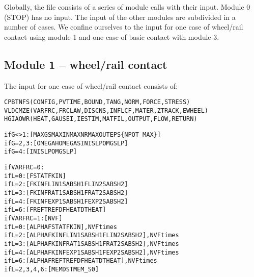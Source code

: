 \documentclass[12pt]{report}
\renewcommand{\magenta}[1]{}
\begin{document}
Globally, the file consists of a series of module calls with their input.
Module 0 (STOP) has no input. The input of the other modules are subdivided
in a number of cases. We confine ourselves to the input for one case of
wheel/rail contact using module 1 and one case of basic contact with module 3.

\subsection{Module 1 -- wheel/rail contact}

The input for one case of wheel/rail contact consists of:
\begin{alltt}\small
% Control integers, see section \ref{sec:controldigits}:

\magenta{ }CPBTNFS  \magenta{   }  (\magenta{        }CONFIG, PVTIME, BOUND , TANG  , NORM  , FORCE , STRESS)
\magenta{ }VLDCMZE  \magenta{\{M\}}  (\magenta{        }VARFRC, FRCLAW, DISCNS, INFLCF, MATER , ZTRACK, EWHEEL\magenta{,
                                                                        MATER2})
\magenta{X}HGIAOWR  \magenta{   }  (\magenta{XFLOW , }HEAT  , GAUSEI, IESTIM, MATFIL, OUTPUT, FLOW  , RETURN)

\magenta{% Parameters for additional debug output

if X=1: [ PSFLCIN \{R\} ] (PROFIL, SMOOTH, FORCE, LOCATE, CPATCH, INFLCF, NMDBG,
                                                                        READLN)

}% Parameters for the iterative solution algorithms (section \ref{sec:iter_const}):

if G<>1:      [ MAXGS   MAXIN   MAXNR   MAXOUT  EPS   \{NPOT\_MAX\}   ]
if G=2,3:     [ OMEGAH  OMEGAS  INISLP  OMGSLP        ]
if G=4:       [ INISLP  OMGSLP                        ]
\magenta{if G=5:       [ FDECAY  BETATH  KDOWFB  D\_IFC   D\_LIN   D\_CNS   D\_SLP   POW\_S ]
}
% Friction description (section \ref{sec:fric_dscrp}):
%      L=0 --> Coulomb friction with constant coefficient of friction
%      L=2 --> velocity dependent friction with linear/const formula
%      L=3 --> velocity dependent friction with rational formula
%      L=4 --> velocity dependent friction with exponential formula
%      L=6 --> temperature dependent friction with piecewise linear formula

if VARFRC=0:
      if L=0: [ FSTAT  FKIN                                ]
      if L=2: [ FKIN   FLIN1  SABSH1  FLIN2  SABSH2        ]
      if L=3: [ FKIN   FRAT1  SABSH1  FRAT2  SABSH2        ]
      if L=4: [ FKIN   FEXP1  SABSH1  FEXP2  SABSH2        ]
      if L=6: [ FREF   TREF   DFHEAT  DTHEAT               ]
if VARFRC=1:  [ NVF                                        ]
      if L=0: [ ALPHA  FSTAT  FKIN                         ], NVF times
      if L=2: [ ALPHA  FKIN   FLIN1  SABSH1  FLIN2  SABSH2 ], NVF times
      if L=3: [ ALPHA  FKIN   FRAT1  SABSH1  FRAT2  SABSH2 ], NVF times
      if L=4: [ ALPHA  FKIN   FEXP1  SABSH1  FEXP2  SABSH2 ], NVF times
      if L=6: [ ALPHA  FREF   TREF   DFHEAT  DTHEAT        ], NVF times
if L=2,3,4,6: [ MEMDST MEM\_S0                              ]


\end{alltt}
\end{document}
